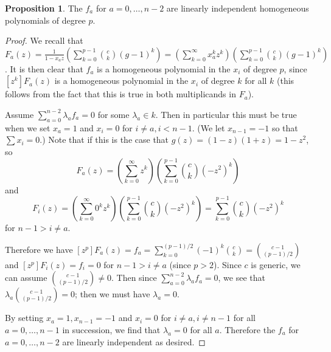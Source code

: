 \documentclass{amsart}
\numberwithin{equation}{section}
\theoremstyle{definition}
\newtheorem{proposition}[equation]{Proposition}
\begin{document}
\begin{proposition}\label{prop:linind} The $f_a$ for $a=0,\dots,n-2$ are linearly independent homogeneous polynomials of degree $p$.
\end{proposition} 

\begin{proof} 
We recall that $F_a(z)=\frac{1}{1-x_az}\left(\sum_{k=0}^{p-1} \binom{c}{k} (g-1)^k\right)=\left(\sum_{k=0}^\infty x_a^kz^k\right)\left(\sum_{k=0}^{p-1} \binom{c}{k} (g-1)^k\right)$. It is then clear that $f_a$ is a homogeneous polynomial in the $x_i$ of degree $p$, since $[z^k]F_a(z)$ is a homogeneous polynomial in the $x_i$ of degree $k$ for all $k$ (this follows from the fact that this is true in both multiplicands in $F_a$). 

Assume $\sum_{a=0}^{n-2} \lambda_af_a=0$ for some $\lambda_a \in k$. Then in particular this must be true when we set $x_a=1$ and $x_i=0$ for $i \ne a,i < n-1$. (We let $x_{n-1}=-1$ so that $\sum x_i=0$.) Note that if this is the case that $g(z)=(1-z)(1+z)=1-z^2$, so 
\[
F_a(z)=\left(\sum_{k=0}^\infty z^k\right)\left(\sum_{k=0}^{p-1} \binom{c}{k} (-z^2)^k\right)
\]
and 
\[
F_i(z)=\left(\sum_{k=0}^\infty 0^kz^k\right)\left(\sum_{k=0}^{p-1} \binom{c}{k} (-z^2)^k\right)=\sum_{k=0}^{p-1} \binom{c}{k} (-z^2)^k
\]
for $n-1>i \ne a$.

Therefore we have $[z^p]F_a(z)=f_a=\sum_{k=0}^{(p-1)/2} (-1)^k\binom{c}{k}=\binom{c-1}{(p-1)/2}$ and $[z^p]F_i(z)=f_i=0$ for $n-1>i \ne a$ (since $p > 2$). Since $c$ is generic, we can assume $\binom{c-1}{(p-1)/2} \ne 0$. Then since $\sum_{a=0}^{n-2} \lambda_af_a=0$, we see that $\lambda_a\binom{c-1}{(p-1)/2}=0$; then we must have $\lambda_a=0$.

By setting $x_a=1,x_{n-1}=-1$ and $x_i=0$ for $i \ne a, i \ne n-1$ for all $a=0,\dots,n-1$ in succession, we find that $\lambda_a=0$ for all $a$. Therefore the $f_a$ for $a=0,\dots,n-2$ are linearly independent as desired.
\end{proof}
\end{document}
